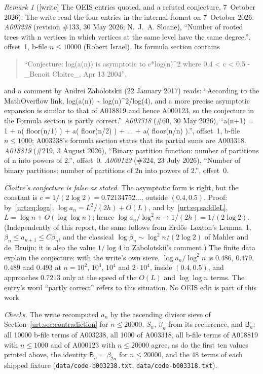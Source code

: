 \documentclass[11pt,letterpaper]{article}
\theoremstyle{remark}\newtheorem{remark}[theorem]{Remark}
\newcommand{\Beta}{\mathsf B}
\newcommand{\file}[1]{\nolinkurl{#1}}
\begin{document}
\begin{remark}[{[write]} The OEIS entries quoted, and a refuted conjecture, 7~October 2026]\label{urt:rem:oeis}
The write read the four entries in the internal format on 7~October 2026.
\emph{A003238} (revision \#133, 30 May 2026; N.~J.~A. Sloane), ``Number of rooted trees with n vertices in which vertices at the same level have the same degree.'', offset~1, b-file $n\le10000$ (Robert Israel). Its formula section contains
\begin{quote}
``Conjecture: log(a(n)) is asymptotic to c*log(n)\^{}2 where 0.4 < c < 0.5 - \_Benoit Cloitre\_, Apr 13 2004'',
\end{quote}
and a comment by Andrei Zabolotskii (22 January 2017) reads: ``According to the MathOverflow link, log(a(n)) \textasciitilde{} log(n)\^{}2/log(4), and a more precise asymptotic expansion is similar to that of A018819 and hence A000123, so the conjecture in the Formula section is partly correct.''
\emph{A003318} (\#60, 30 May 2026), ``a(n+1) = 1 + a( floor(n/1) ) + a( floor(n/2) ) + ... + a( floor(n/n) ).'', offset~1, b-file $n\le1000$; A003238's formula section states that its partial sums are A003318. \emph{A018819} (\#219, 3 August 2026), ``Binary partition function: number of partitions of n into powers of 2.'', offset~0. \emph{A000123} (\#324, 23 July 2026), ``Number of binary partitions: number of partitions of 2n into powers of 2.'', offset~0.

\emph{Cloitre's conjecture is false as stated.} The asymptotic form is right, but the constant is $c=1/(2\log2)=0.72134752\ldots$, outside $(0.4,0.5)$. Proof: by~\eqref{urt:eq:loga}, $\log a_n=L^2/(2h)+O(L)$, and by~\eqref{urt:eq:saddleL}, $L=\log n+O(\log\log n)$; hence $\log a_n/\log^2n\to1/(2h)=1/(2\log2)$. (Independently of this report, the same follows from Erd\H{o}s--Loxton's Lemma~1, $\beta_n\le a_{n+1}\le C\beta_n$, and the classical $\log\beta_n\sim\log^2n/(2\log2)$ of Mahler and de~Bruijn; it is also the value $1/\log4$ in Zabolotskii's comment.) The finite data explain the conjecture: with the write's own sieve, $\log a_n/\log^2n$ is $0.486$, $0.479$, $0.489$ and $0.493$ at $n=10^2$, $10^3$, $10^4$ and $2\cdot10^4$, inside $(0.4,0.5)$, and approaches $0.7213$ only at the speed of the $O(L)$ and $\log\log n$ terms. The entry's word ``partly correct'' refers to this situation. No OEIS edit is part of this work.

\emph{Checks.} The write recomputed $a_n$ by the ascending divisor sieve of Section~\ref{urt:sec:contradiction} for $n\le20000$, $S_n$, $\beta_n$ from its recurrence, and $\Beta_n$: all 10000 b-file terms of A003238, all 1000 of A003318, all b-file terms of A018819 with $n\le1000$ and of A000123 with $n\le20000$ agree, as do the first ten values printed above, the identity $\Beta_n=\beta_{2n}$ for $n\le20000$, and the 48 terms of each shipped fixture (\file{data/code-b003238.txt}, \file{data/code-b003318.txt}).
\end{remark}
\end{document}
